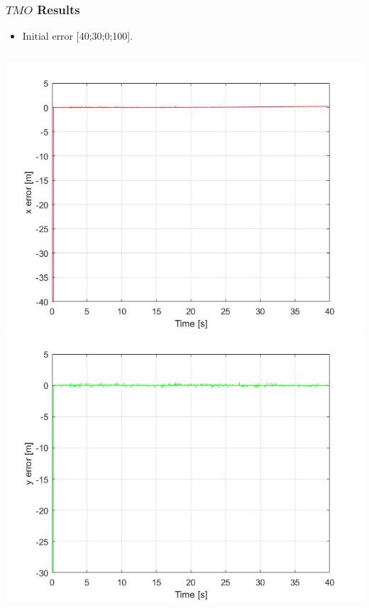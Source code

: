 \documentclass{beamer}
\begin{document}
	\begin{frame}
		\frametitle{$TMO$ Results}
			\begin{itemize}
				\item Initial error [40;30;0;100].
			\end{itemize}
			\begin{columns}[t]
				\centering
				\includegraphics[scale=0.18]{nlo_x_1}\\
				\includegraphics[scale=0.18]{nlo_y_1}
				\centering

\end{columns}
\end{frame}
\end{document}
